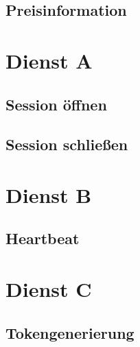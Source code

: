\subsection*{Preisinformation}
\label{subsec:Nachrichten:Dienst6:PriceInformation}



\section{Dienst A}
\label{subsec:Nachrichten:DienstA}

\subsection*{Session öffnen}
\label{subsec:Nachrichten:DienstA:OpenSession}


\subsection*{Session schließen}
\label{subsec:Nachrichten:DienstA:CloseSession}



\section{Dienst B}
\label{subsec:Nachrichten:DienstB}

\subsection*{Heartbeat}
\label{subsec:Nachrichten:DienstB:HeartBeat}




\section{Dienst C}
\label{subsec:Nachrichten:DienstC}

\subsection*{Tokengenerierung}
\label{subsec:Nachrichten:DienstC:HeartBeat}

